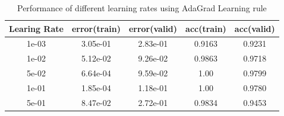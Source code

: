 \documentclass[11pt]{article}
\begin{document}
\begin{table}
\begin{center}
\begin{tabular}{ c c c c c} 
\hline
Learing Rate & error(train) & error(valid) & acc(train) & acc(valid)\\
\hline
\hline
1e-03 & 3.05e-01 & 2.83e-01 & 0.9163 & 0.9231 \\ 
1e-02 & 5.12e-02 & 9.26e-02 & 0.9863 & 0.9718 \\ 
5e-02 & 6.64e-04 & 9.59e-02 & 1.00 & 0.9799 \\ 
1e-01  &  1.85e-04 & 1.18e-01 & 1.00 & 0.9780 \\
5e-01  &  8.47e-02 & 2.72e-01 & 0.9834 & 0.9453 \\
\end{tabular}
\caption{Performance of different learning rates using AdaGrad Learning rule}
\label{tb:adagrad}
\end{center}	
\end{table}
\end{document}

